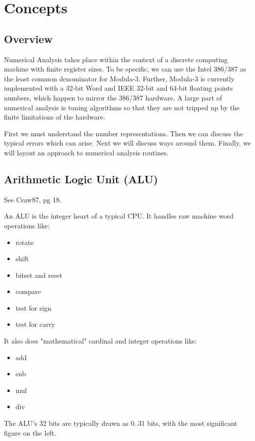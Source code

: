 \section{Concepts}

\subsection{Overview}
Numerical Analysis takes place within the context of a
discrete computing machine with finite register sizes.  To
be specific, we can use the Intel 386/387 as the least
common denominator for Modula-3.  Further, Modula-3 is
currently implemented with a 32-bit Word and IEEE 32-bit and
64-bit floating points numbers, which happen to mirror the
386/387 hardware.  A large part of numerical analysis is
tuning algorithms so that they are not tripped up by the
finite limitations of the hardware.

First we must understand the number representations.  Then
we can discuss the typical errors which can arise.  Next we
will discuss ways around them.  Finally, we will layout an
approach to numerical analysis routines.

\subsection{Arithmetic Logic Unit (ALU)}
See Craw87, pg 18.

An ALU is the integer heart of a typical CPU.  It handles
raw machine word operations like:
\begin{itemize}
   \item  rotate
   \item  shift
   \item  bitset and reset
   \item  compare
   \item  test for sign
   \item  test for carry
\end{itemize}

It also does "mathematical" cardinal and integer operations
like:
\begin{itemize}
   \item  add
   \item  sub
   \item  mul
   \item  div
\end{itemize}
     
The ALU's 32 bits are typically drawn as 0..31 bits, with
the most significant figure on the left.

